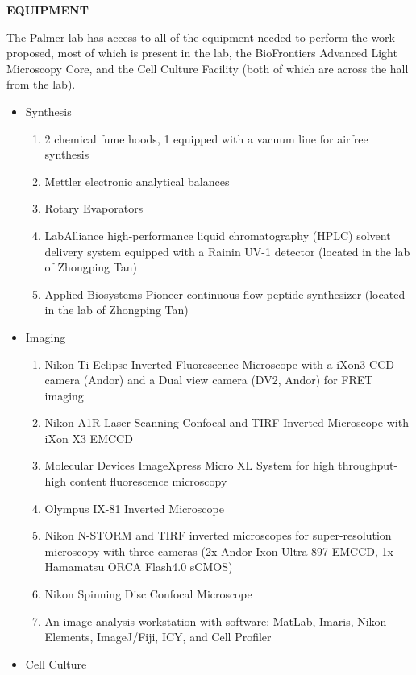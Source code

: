 \documentclass{F32}
\begin{document}
\begin{center}
\bf EQUIPMENT
\end{center}

The Palmer lab has access to all of the equipment needed to perform the work proposed, most of which is present in the lab, the BioFrontiers Advanced Light Microscopy Core, and the Cell Culture Facility (both of which are across the hall from the lab).

\begin{itemize}
  \item Synthesis \begin{enumerate}
    \item 2 chemical fume hoods, 1 equipped with a vacuum line for airfree synthesis
    \item Mettler electronic analytical balances
    \item Rotary Evaporators
    \item LabAlliance high-performance liquid chromatography (HPLC) solvent delivery system equipped with a Rainin UV-1 detector (located in the lab of Zhongping Tan)
    \item Applied Biosystems Pioneer continuous flow peptide synthesizer (located in the lab of Zhongping Tan)
  \end{enumerate}
  \item Imaging \begin{enumerate}
    \item Nikon Ti-Eclipse Inverted Fluorescence Microscope with a iXon3 CCD camera (Andor) and a Dual view camera (DV2, Andor) for FRET imaging
    \item Nikon A1R Laser Scanning Confocal and TIRF Inverted Microscope with iXon X3 EMCCD
    \item Molecular Devices ImageXpress Micro XL System for high throughput-high content fluorescence microscopy
    \item Olympus IX-81 Inverted Microscope
    \item Nikon N-STORM and TIRF inverted microscopes for super-resolution microscopy with three cameras (2x Andor Ixon Ultra 897 EMCCD, 1x Hamamatsu ORCA Flash4.0 sCMOS)
    \item Nikon Spinning Disc Confocal Microscope
    \item An image analysis workstation with software: MatLab, Imaris, Nikon Elements, ImageJ/Fiji, ICY, and Cell Profiler
  \end{enumerate}
  \item Cell Culture \begin{enumerate}

\end{enumerate}
\end{itemize}
\end{document}
